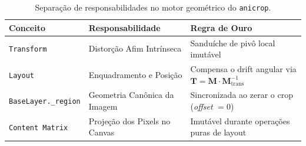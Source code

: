 \documentclass[12pt,a4paper]{article}
\begin{document}
\begin{table}[h!]
\centering
\begin{tabular}{@{}lll@{}}
\toprule
\textbf{Conceito} & \textbf{Responsabilidade} & \textbf{Regra de Ouro} \\ \midrule
\texttt{Transform} & Distorção Afim Intrínseca & Sanduíche de pivô local imutável \\
\texttt{Layout} & Enquadramento e Posição & Compensa o drift angular via $\mathbf{T} = \mathbf{M} \cdot \mathbf{M}_{\text{trans}}^{-1}$ \\
\texttt{BaseLayer.\_region} & Geometria Canônica da Imagem & Sincronizada ao zerar o crop (\textit{offset} $= 0$) \\
\texttt{Content Matrix} & Projeção dos Pixels no Canvas & Imutável durante operações puras de layout \\ \bottomrule
\end{tabular}
\caption{Separação de responsabilidades no motor geométrico do \texttt{anicrop}.}
\end{table}
\end{document}
